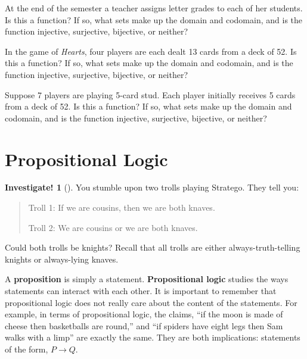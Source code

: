 \documentclass[10pt,]{book}
\newcommand{\terminology}[1]{\textbf{#1}}
\theoremstyle{plain}
\theoremstyle{definition}
\theoremstyle{definition}
\theoremstyle{definition}
\newtheorem{investigation}[project]{Investigate!}
\theoremstyle{definition}
\numberwithin{equation}{chapter}
\def\imp{\rightarrow}
\begin{document}
\begin{divisionexercise}{15}\hypertarget{exercise-217}{}
\hypertarget{p-1776}{}%
At the end of the semester a teacher assigns letter grades to each of her students. Is this a function? If so, what sets make up the domain and codomain, and is the function injective, surjective, bijective, or neither?%
\end{divisionexercise}%
\begin{divisionexercise}{16}\hypertarget{exercise-218}{}
\hypertarget{p-1778}{}%
In the game of \emph{Hearts}, four players are each dealt 13 cards from a deck of 52. Is this a function? If so, what sets make up the domain and codomain, and is the function injective, surjective, bijective, or neither?%
\end{divisionexercise}%
\begin{divisionexercise}{17}\hypertarget{exercise-219}{}
\hypertarget{p-1780}{}%
Suppose 7 players are playing 5-card stud. Each player initially receives 5 cards from a deck of 52. Is this a function? If so, what sets make up the domain and codomain, and is the function injective, surjective, bijective, or neither?%
\end{divisionexercise}%
\typeout{************************************************}
\typeout{************************************************}
\section[{Propositional Logic}]{Propositional Logic}\label{sec_propositional}
\begin{investigation}[]\label{investigation-13}
\hypertarget{p-1782}{}%
You stumble upon two trolls playing Stratego\textregistered{}.  They tell you:%
\begin{quote}\hypertarget{blockquote-9}{}
\hypertarget{p-1783}{}%
Troll 1: If we are cousins, then we are both knaves.%
\par
\hypertarget{p-1784}{}%
Troll 2: We are cousins or we are both knaves.%
\end{quote}
\hypertarget{p-1785}{}%
Could both trolls be knights?  Recall that all trolls are either always-truth-telling knights or always-lying knaves.%
\end{investigation}
\hypertarget{p-1786}{}%
A \terminology{proposition} is simply a statement. \terminology{Propositional logic} studies the ways statements can interact with each other. It is important to remember that propositional logic does not really care about the content of the statements. For example, in terms of propositional logic, the claims, ``if the moon is made of cheese then basketballs are round,'' and ``if spiders have eight legs then Sam walks with a limp'' are exactly the same. They are both implications: statements of the form, \(P \imp Q\).%
\typeout{************************************************}
\typeout{************************************************}
\end{document}

